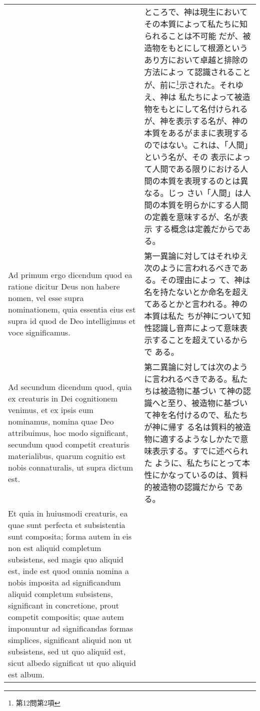\documentclass[10pt]{jsarticle}
\begin{document}
\begin{longtable}{p{21em}p{21em}}
&

ところで、神は現生においてその本質によって私たちに知られることは不可能
だが、被造物をもとにして根源というあり方において卓越と排除の方法によっ
て認識されることが、前に\footnote{第12問第2項}示された。それゆえ、神は
私たちによって被造物をもとにして名付けられるが、神を表示する名が、神の
本質をあるがままに表現するのではない。これは、「人間」という名が、その
表示によって人間である限りにおける人間の本質を表現するのとは異なる。じっ
さい「人間」は人間の本質を明らかにする人間の定義を意味するが、名が表示
する概念は定義だからである。

\\

{\sc Ad primum ergo dicendum} quod ea ratione dicitur Deus non habere
nomen, vel esse supra nominationem, quia essentia eius est supra id
quod de Deo intelligimus et voce significamus.

&

第一異論に対してはそれゆえ次のように言われるべきである。その理由によっ
て、神は名を持たないとか命名を超えてあるとかと言われる。神の本質は私た
ちが神について知性認識し音声によって意味表示することを超えているからで
ある。

\\

{\sc Ad secundum dicendum} quod, quia ex creaturis in Dei cognitionem
venimus, et ex ipsis eum nominamus, nomina quae Deo attribuimus, hoc
modo significant, secundum quod competit creaturis materialibus, quarum
cognitio est nobis connaturalis, ut supra dictum est. 

&

第二異論に対しては次のように言われるべきである。私たちは被造物に基づい
て神の認識へと至り、被造物に基づいて神を名付けるので、私たちが神に帰す
る名は質料的被造物に適するようなしかたで意味表示する。すでに述べられた
ように、私たちにとって本性にかなっているのは、質料的被造物の認識だから
である。

\\

Et quia in huiusmodi creaturis, ea quae sunt perfecta et subsistentia
sunt composita; forma autem in eis non est aliquid completum
subsistens, sed magis quo aliquid est, inde est quod omnia nomina a
nobis imposita ad significandum aliquid completum subsistens,
significant in concretione, prout competit compositis; quae autem
imponuntur ad significandas formas simplices, significant aliquid non
ut subsistens, sed ut quo aliquid est, sicut albedo significat ut quo
aliquid est album.


\end{longtable}
\end{document}
